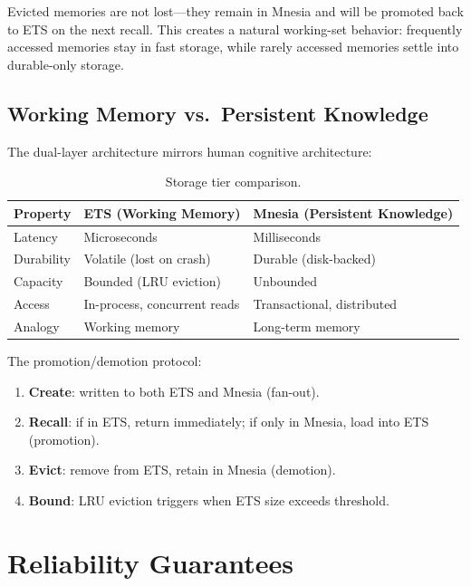 \documentclass[12pt,a4paper]{article}
\theoremstyle{definition}
\begin{document}
Evicted memories are not lost---they remain in Mnesia and will be promoted back to ETS on the next recall.
This creates a natural working-set behavior: frequently accessed memories stay in fast storage, while rarely accessed memories settle into durable-only storage.

\subsection{Working Memory vs.\ Persistent Knowledge}\label{subsec:working-vs-persistent}

The dual-layer architecture mirrors human cognitive architecture:

\begin{table}[H]
\centering
\caption{Storage tier comparison.}
\label{tab:storage-tiers}
\begin{tabularx}{\textwidth}{lXX}
\toprule
\textbf{Property} & \textbf{ETS (Working Memory)} & \textbf{Mnesia (Persistent Knowledge)} \\
\midrule
Latency & Microseconds & Milliseconds \\
Durability & Volatile (lost on crash) & Durable (disk-backed) \\
Capacity & Bounded (LRU eviction) & Unbounded \\
Access & In-process, concurrent reads & Transactional, distributed \\
Analogy & Working memory~\citep{baddeley1992working} & Long-term memory \\
\bottomrule
\end{tabularx}
\end{table}

The promotion/demotion protocol:
\begin{enumerate}
  \item \textbf{Create}: written to both ETS and Mnesia (fan-out).
  \item \textbf{Recall}: if in ETS, return immediately; if only in Mnesia, load into ETS (promotion).
  \item \textbf{Evict}: remove from ETS, retain in Mnesia (demotion).
  \item \textbf{Bound}: LRU eviction triggers when ETS size exceeds threshold.
\end{enumerate}

\section{Reliability Guarantees}\label{sec:reliability}
\end{document}
